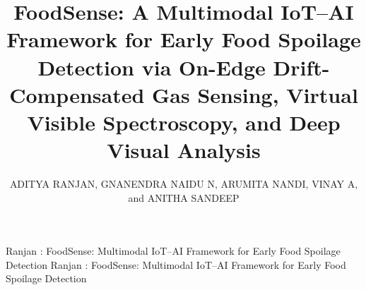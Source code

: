 \documentclass{ieeeaccess}
\begin{document}

\title{FoodSense: A Multimodal IoT--AI Framework for Early Food Spoilage Detection via On-Edge Drift-Compensated Gas Sensing, Virtual Visible Spectroscopy, and Deep Visual Analysis}

\author{
  \uppercase{Aditya Ranjan},
  \uppercase{Gnanendra Naidu N},
  \uppercase{Arumita Nandi},
  \uppercase{Vinay A},
  and \uppercase{Anitha Sandeep}
}

\address[1]{Department of Computer Science Engineering, RV College of Engineering, Bengaluru 560059, India
  (e-mail: adityaranjan@rvce.edu.in; gnanendra@rvce.edu.in; anithasandeep@rvce.edu.in)}
\address[2]{Department of Electronics and Communication Engineering, RV College of Engineering, Bengaluru 560059, India
  (e-mail: arumita@rvce.edu.in; vinaya@rvce.edu.in)}


\markboth
{Ranjan \headeretal: FoodSense: Multimodal IoT--AI Framework for Early Food Spoilage Detection}
{Ranjan \headeretal: FoodSense: Multimodal IoT--AI Framework for Early Food Spoilage Detection}

\end{document}
